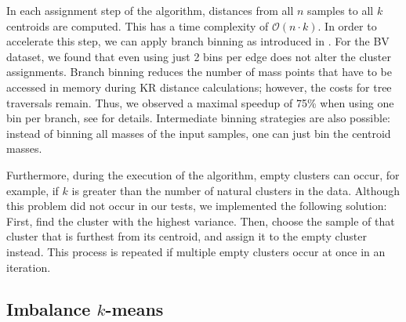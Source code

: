 In each assignment step of the algorithm, distances from all $n$ samples to all $k$ centroids are computed.
This has a time complexity of $\mathcal{O}(n \cdot k)$.
In order to accelerate this step, we can apply branch binning
as introduced in .
For the \ac{BV} dataset, we found that even using just \num{2} bins per edge does not alter the cluster assignments.
Branch binning reduces the number of mass points that have to be accessed in memory during KR distance calculations;
however, the costs for tree traversals remain.
Thus, we observed a maximal speedup of 75\% when using one bin per branch,
see  for details.
Intermediate binning strategies are also possible:
instead of binning all masses of the input samples, one can just bin the centroid masses.


Furthermore, during the execution of the algorithm, empty clusters can occur,
for example, if $k$ is greater than the number of natural clusters in the data.
Although this problem did not occur in our tests, we implemented the following solution:
First, find the cluster with the highest variance.
Then, choose the sample of that cluster that is furthest from its centroid,
and assign it to the empty cluster instead.
This process is repeated if multiple empty clusters occur at once in an iteration.


\subsection{Imbalance \texorpdfstring{$k$-means}{k-means}}
\label{ch:Clustering:sec:Methods:sub:ImbalanceKmeans}

